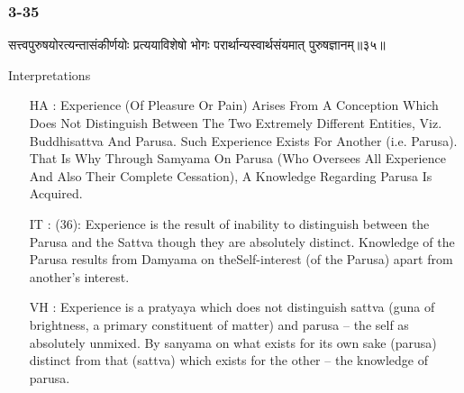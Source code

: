\begin{frame}[fragile]\frametitle{3-35}
\begin{sanskrit}
सत्त्वपुरुषयोरत्यन्तासंकीर्णयोः प्रत्ययाविशेषो भोगः परार्थान्यस्वार्थसंयमात् पुरुषज्ञानम्॥३५॥
\end{sanskrit}

Interpretations
\begin{itemize}	
\item [HA]: Experience (Of Pleasure Or Pain) Arises From A Conception Which Does Not Distinguish Between The Two Extremely Different Entities, Viz. Buddhisattva And Parusa. Such Experience Exists For Another (i.e. Parusa). That Is Why Through Samyama On Parusa (Who Oversees All Experience And Also Their Complete Cessation), A Knowledge Regarding Parusa Is Acquired.
\item [IT]: (36): Experience is the result of inability to distinguish between the Parusa and the Sattva though they are absolutely distinct. Knowledge of the Parusa results from Damyama on theSelf-interest (of the Parusa) apart from another’s interest.
\item [VH]: Experience is a pratyaya which does not distinguish sattva (guna of brightness, a primary constituent of matter) and parusa – the self as absolutely unmixed. By sanyama on what exists for its own sake (parusa) distinct from that (sattva) which exists for the other – the knowledge of parusa.		
\end{itemize}
\end{frame}


